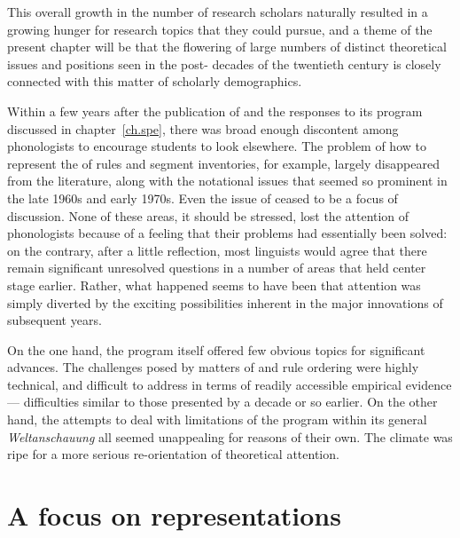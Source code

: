 This overall growth in the number of research scholars naturally
resulted in a growing hunger for research topics that they could
pursue, and a theme of the present chapter will be that the flowering
of large numbers of distinct theoretical issues and positions seen in
the post-\textsl{} decades of the twentieth century is closely
connected with this matter of scholarly demographics.

Within a few years after the publication of \textsl{} and the
responses to its program discussed in chapter~\ref{ch.spe}, there was
broad enough discontent among phonologists to encourage students to
look elsewhere. The problem of how to represent the  of
rules and segment inventories, for example, largely disappeared from
the literature, along with the notational issues that seemed so
prominent in the late 1960s and early 1970s. Even the issue of
 ceased to be a focus of discussion. None of these areas,
it should be stressed, lost the attention of phonologists because of a
feeling that their problems had essentially been solved: on the
contrary, after a little reflection, most linguists would agree that
there remain significant unresolved questions in a number of areas
that held center stage earlier. Rather, what happened seems to have
been that attention was simply diverted by the exciting possibilities
inherent in the major innovations of subsequent years.

On the one hand, the \textsl{} program itself offered few obvious
topics for significant advances. The challenges posed by matters of
 and rule ordering were highly technical, and
difficult to address in terms of readily accessible empirical evidence
--- difficulties similar to those presented by  a
decade or so earlier. On the other hand, the attempts to deal with
limitations of the \textsl{} program within its general
\emph{Weltanschauung} all seemed unappealing for reasons of their
own. The climate was ripe for a more serious re-orientation of
theoretical attention.

\section{A focus on representations}
\label{sec:representations}

